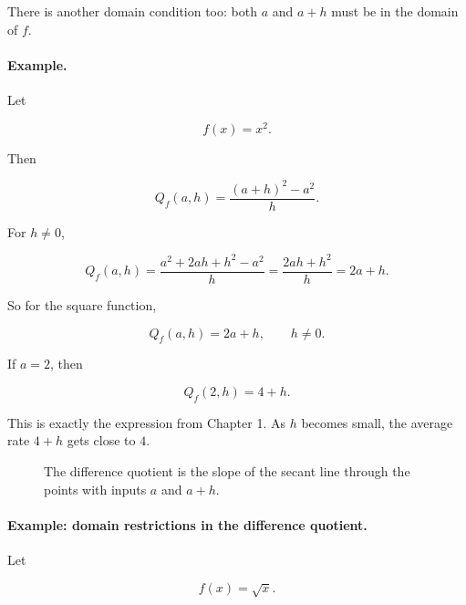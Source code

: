 There is another domain condition too: both \(a\) and \(a+h\) must be in the domain of \(f\).

\paragraph{Example.}
Let

\[
f(x)=x^2.
\]

Then

\[
Q_f(a,h)
=
\frac{(a+h)^2-a^2}{h}.
\]

For \(h\neq 0\),

\[
Q_f(a,h)
=
\frac{a^2+2ah+h^2-a^2}{h}
=
\frac{2ah+h^2}{h}
=
2a+h.
\]

So for the square function,

\[
\boxed{Q_f(a,h)=2a+h,\qquad h\neq 0.}
\]

If \(a=2\), then

\[
Q_f(2,h)=4+h.
\]

This is exactly the expression from Chapter 1. As \(h\) becomes small, the average rate \(4+h\) gets close to \(4\).

\begin{figure}[h]
\centering
{}
\caption{The difference quotient is the slope of the secant line through the points with inputs \(a\) and \(a+h\).}
\label{fig:difference-quotient-secant}
\end{figure}

\paragraph{Example: domain restrictions in the difference quotient.}
Let

\[
f(x)=\sqrt{x}.
\]

